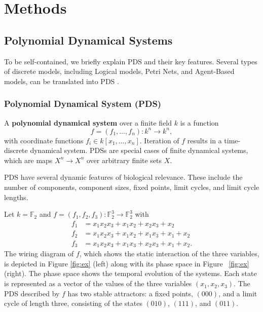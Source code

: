 \documentclass[11pt]{amsart}
\newenvironment{example}[1][Example]{\begin{trivlist}
\item[\hskip \labelsep {\bfseries #1}]}{\end{trivlist}}
\begin{document}
\section{Methods}
\subsection{Polynomial Dynamical Systems}
To be self-contained, we briefly explain PDS and their key features. 
Several types of discrete models, including Logical models, Petri
Nets, and Agent-Based models, can be translated into PDS \cite{Alan:Bioinf2010,Hinkelmann:2010}.

\subsubsection{Polynomial Dynamical System (PDS)}
A {\bf polynomial dynamical system} \cite{JLSS} over a finite field $k$ is a function
$$f = (f_1, \ldots, f_n) : k^n \rightarrow k^n,$$ 
with coordinate functions $f_i \in k[x_1, \ldots , x_n]$. Iteration of $f$ results
in a time-discrete dynamical system. PDSs are special cases of finite
dynamical systems, which are maps $X^n \rightarrow   X^n$ over arbitrary
finite sets $X$.

PDS have several dynamic features of biological
relevance. These include the number of components, component sizes, fixed
points, limit cycles, and limit cycle lengths. 
\begin{example}
Let $k= \mathbb F_2$ and $f = (f_1, f_2, f_3) : \mathbb F_2^3 \rightarrow
\mathbb F_2^3$ with 
\begin{align*}
f_1 &= x_1x_2x_3+x_1x_2+x_2x_3+x_2 \\
f_2 &= x_1x_2x_3+x_1x_2+x_1x_3+x_1+x_2 \\
f_3 &= x_1x_2x_3+x_1x_3+x_2x_3+x_1+x_2.
\end{align*}
The wiring diagram of $f$, which shows the static interaction of the three
variables, is
depicted in Figure \ref{fig:ex} (left) along with its phase space in Figure
~\ref{fig:ex} (right).
The phase space shows the temporal evolution of the systems. Each state is 
represented as a vector of the values of the three variables $(x_1, x_2,
x_3)$. 
The PDS described by $f$ has
two stable attractors: a fixed points, $(000)$, and a limit cycle of length
three, consisting of the states $(010)$, $(111)$, and $(011)$.
\end{example}
\end{document}
